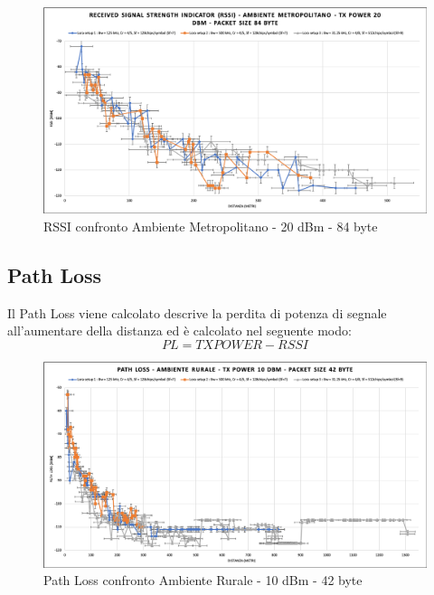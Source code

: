 \documentclass[12pt,a4paper,openright,twoside]{report}
\begin{document}
\begin{figure}[h]                      
\begin{center} 
\includegraphics[width=\textwidth]{RSSI_confronto_AM-20dBm-84byte.png}
\caption[RSSI confronto Ambiente Metropolitano - 20 dBm - 84 byte]{RSSI confronto Ambiente Metropolitano - 20 dBm - 84 byte}\label{fig:prima}
\end{center}
\end{figure}




\subsection{Path Loss}
Il Path Loss viene calcolato descrive la perdita di potenza di segnale all'aumentare della distanza ed \`e calcolato nel seguente modo:
\begin{equation*} PL = TXPOWER - RSSI \end{equation*}
\begin{figure}[h]                      
\begin{center} 
\includegraphics[width=\textwidth]{PATH_LOSS_confronto_AR_10dBm_42byte.png}
\caption[Path Loss confronto Ambiente Rurale - 10 dBm - 42 byte]{Path Loss confronto Ambiente Rurale - 10 dBm - 42 byte}\label{fig:prima}
\end{center}
\end{figure}
\end{document}
